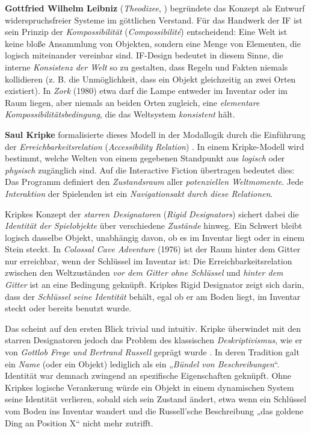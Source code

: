 \documentclass[parskip=half,a4paper,11pt]{scrreprt}
\begin{document}
\textbf{Gottfried Wilhelm Leibniz} (\textit{Theodizee}, \citep{Leibniz1710}) begründete das Konzept als Entwurf widerspruchsfreier Systeme im göttlichen Verstand. Für das Handwerk der IF ist sein Prinzip der \textit{Kompossibilität} (\textit{Compossibilité}) entscheidend: Eine Welt ist keine bloße Ansammlung von Objekten, sondern eine Menge von Elementen, die logisch miteinander vereinbar sind. IF-Design bedeutet in diesem Sinne, die interne \textit{Konsistenz der Welt} so zu gestalten, dass Regeln und Fakten niemals kollidieren (z. B. die Unmöglichkeit, dass ein Objekt gleichzeitig an zwei Orten existiert). In \textit{Zork} (1980) etwa darf die Lampe entweder im Inventar oder im Raum liegen, aber niemals an beiden Orten zugleich, eine \textit{elementare Kompossibilitätsbedingung}, die das Weltsystem \textit{konsistent} hält.

\textbf{Saul Kripke} formalisierte dieses Modell in der Modallogik durch die Einführung der \textit{Erreichbarkeitsrelation} (\textit{Accessibility Relation}) \citep{Kripke1972}. In einem Kripke-Modell wird bestimmt, welche Welten von einem gegebenen Standpunkt aus \textit{logisch} oder\textit{ physisch }zugänglich sind. Auf die Interactive Fiction übertragen bedeutet dies: Das Programm definiert den \textit{Zustandsraum} aller \textit{potenziellen Weltmomente}. Jede \textit{Interaktion }der Spielenden ist ein \textit{Navigationsakt durch diese Relationen}. 

Kripkes Konzept der \textit{starren Designatoren} (\textit{Rigid Designators}) sichert dabei die \textit{Identität der Spielobjekte} über verschiedene\textit{ Zustände} hinweg. Ein Schwert bleibt logisch dasselbe Objekt, unabhängig davon, ob es im Inventar liegt oder in einem Stein steckt. In \textit{Colossal Cave Adventure} (1976) ist der Raum hinter dem Gitter nur erreichbar, wenn der Schlüssel im Inventar ist: Die Erreichbarkeitsrelation zwischen den Weltzuständen \textit{vor dem Gitter ohne Schlüssel} und \textit{hinter dem Gitter} ist an eine Bedingung geknüpft. Kripkes Rigid Designator zeigt sich darin, dass der \textit{Schlüssel seine Identität }behält, egal ob er am Boden liegt, im Inventar steckt oder bereits benutzt wurde. 

Das scheint auf den ersten Blick trivial und intuitiv. Kripke überwindet mit den starren Designatoren jedoch das Problem des klassischen \textit{Deskriptivismus}, wie er von \textit{Gottlob Frege und Bertrand Russell} geprägt wurde \citep{Frege1892,Russell1905}. In deren Tradition galt ein \textit{Name} (oder ein Objekt) lediglich als ein „\textit{Bündel von Beschreibungen}“. Identität war demnach zwingend an spezifische Eigenschaften geknüpft. Ohne Kripkes logische Verankerung würde ein Objekt in einem dynamischen System seine Identität verlieren, sobald sich sein Zustand ändert, etwa wenn ein Schlüssel vom Boden ins Inventar wandert und die Russell’sche Beschreibung „das goldene Ding an Position X“ nicht mehr zutrifft.
\end{document}
